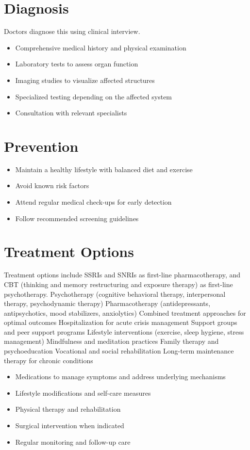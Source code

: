 \section{Diagnosis}
Doctors diagnose this using clinical interview.

\begin{itemize}[noitemsep]
  \item Comprehensive medical history and physical examination
  \item Laboratory tests to assess organ function
  \item Imaging studies to visualize affected structures
  \item Specialized testing depending on the affected system
  \item Consultation with relevant specialists
\end{itemize}
\section{Prevention}
\begin{itemize}[noitemsep]
  \item Maintain a healthy lifestyle with balanced diet and exercise
  \item Avoid known risk factors
  \item Attend regular medical check-ups for early detection
  \item Follow recommended screening guidelines
\end{itemize}
\section{Treatment Options}
Treatment options include SSRIs and SNRIs as first-line pharmacotherapy, and CBT (thinking and memory restructuring and exposure therapy) as first-line psychotherapy. Psychotherapy (cognitive behavioral therapy, interpersonal therapy, psychodynamic therapy) Pharmacotherapy (antidepressants, antipsychotics, mood stabilizers, anxiolytics) Combined treatment approaches for optimal outcomes Hospitalization for acute crisis management Support groups and peer support programs Lifestyle interventions (exercise, sleep hygiene, stress management) Mindfulness and meditation practices Family therapy and psychoeducation Vocational and social rehabilitation Long-term maintenance therapy for chronic conditions

\begin{itemize}[noitemsep]
  \item Medications to manage symptoms and address underlying mechanisms
  \item Lifestyle modifications and self-care measures
  \item Physical therapy and rehabilitation
  \item Surgical intervention when indicated
  \item Regular monitoring and follow-up care
\end{itemize}
